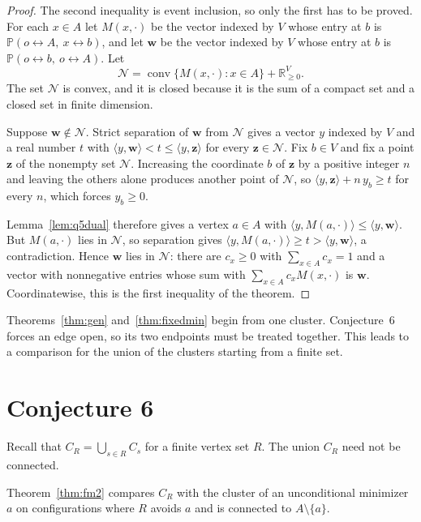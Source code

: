 \documentclass[11pt]{article}
\theoremstyle{definition}
\theoremstyle{remark}
\newcommand{\PP}{\mathbb P}
\newcommand{\con}{\leftrightarrow}
\begin{document}
\begin{proof}
The second inequality is event inclusion, so only the first has to be proved. For each
$x\in A$ let $M(x,\cdot)$ be the vector indexed by $V$ whose entry at $b$ is $\PP(o\con A,\
x\con b)$, and let $\mathbf w$ be the vector indexed by $V$ whose entry at $b$ is
$\PP(o\con b,\ o\con A)$. Let
\[
 \mathcal N=\operatorname{conv}\{M(x,\cdot):x\in A\}+\mathbb R_{\geq0}^{V}.
\]
The set $\mathcal N$ is
convex, and it is closed because it is the sum of a compact set and a closed set in finite
dimension.

Suppose $\mathbf w\notin\mathcal N$. Strict separation of $\mathbf w$ from $\mathcal N$
gives a vector $y$ indexed by $V$ and a real number $t$ with $\langle y,\mathbf
w\rangle<t\leq\langle y,\mathbf z\rangle$ for every $\mathbf z\in\mathcal N$. Fix $b\in V$ and fix a point
$\mathbf z$ of the nonempty set $\mathcal N$. Increasing the coordinate $b$ of $\mathbf z$
by a positive integer $n$ and leaving the others alone produces another point of $\mathcal
N$, so $\langle y,\mathbf z\rangle+n\,y_b\geq t$ for every $n$, which forces $y_b\geq0$.

Lemma~\ref{lem:q5dual} therefore gives a vertex $a\in A$ with $\langle
y,M(a,\cdot)\rangle\leq\langle y,\mathbf w\rangle$. But $M(a,\cdot)$ lies in $\mathcal N$,
so separation gives $\langle y,M(a,\cdot)\rangle\geq t>\langle y,\mathbf w\rangle$, a
contradiction. Hence $\mathbf w$ lies in $\mathcal N$: there are $c_x\geq0$ with $\sum_{x\in
A}c_x=1$ and a vector with nonnegative entries whose sum with $\sum_{x\in A}c_xM(x,\cdot)$
is $\mathbf w$. Coordinatewise, this is the first inequality of the theorem.
\end{proof}

Theorems~\ref{thm:gen} and~\ref{thm:fixedmin} begin from one cluster. Conjecture~6 forces
an edge open, so its two endpoints must be treated together. This leads to a comparison
for the union of the clusters starting from a finite set.

\section{Conjecture 6}\label{sec:c6}

Recall that $C_R=\bigcup_{s\in R}C_s$ for a finite vertex set $R$. The union $C_R$ need
not be connected.

Theorem~\ref{thm:fm2} compares $C_R$ with the cluster of an unconditional minimizer $a$ on
configurations where $R$ avoids $a$ and is connected to $A\setminus\{a\}$.
\end{document}
